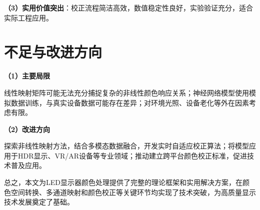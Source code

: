 \noindent\textbf{（3）实用价值突出}：校正流程简洁高效，数值稳定性良好，实验验证充分，适合实际工程应用。

\section[\hspace{-2pt}不足与改进方向]{{\heiti{} \hspace{-8pt}不足与改进方向}}\label{section5: 不足与改进方向}

\noindent\textbf{（1）主要局限}

线性映射矩阵可能无法充分捕捉复杂的非线性颜色响应关系；神经网络模型使用模拟数据训练，与真实设备数据可能存在差异；对环境光照、设备老化等外在因素考虑有限。

\noindent\textbf{（2）改进方向}

探索非线性映射方法，结合多模态数据融合，开发实时自适应校正算法；将模型应用于HDR显示、VR/AR设备等专业领域；推动建立跨平台颜色校正标准，促进技术普及应用。

总之，本文为LED显示器颜色处理提供了完整的理论框架和实用解决方案，在颜色空间转换、多通道映射和颜色校正等关键环节均实现了技术突破，为高质量显示技术发展奠定了基础。
